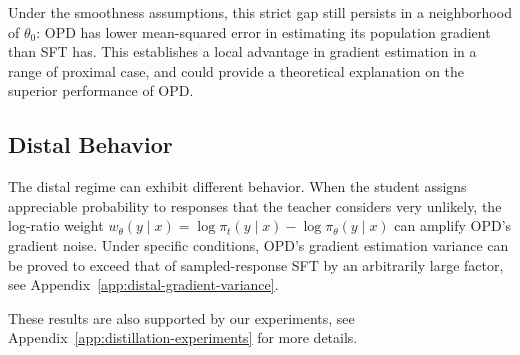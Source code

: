 Under the smoothness assumptions, this strict gap still persists in a neighborhood of $\theta_0$: OPD has lower mean-squared error in estimating its population gradient than SFT has. This establishes a local advantage in gradient estimation in a range of proximal case, and could provide a theoretical explanation on the superior performance of OPD.

\subsection{Distal Behavior}

The distal regime can exhibit different behavior. When the student assigns appreciable probability to responses that the teacher considers very unlikely, the log-ratio weight $w_\theta(y\mid x)=\log\pi_t(y\mid x)-\log\pi_\theta(y\mid x)$ can amplify OPD's gradient noise. Under specific conditions, OPD's gradient estimation variance can be proved to exceed that of sampled-response SFT by an arbitrarily large factor, see Appendix~\ref{app:distal-gradient-variance}.




These results are also supported by our experiments, see Appendix~\ref{app:distillation-experiments} for more details.
